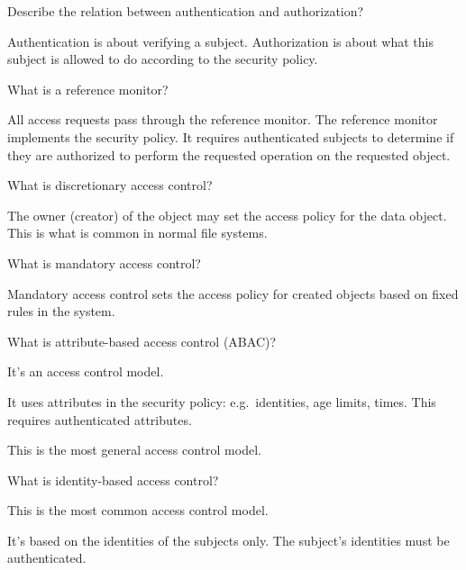 \question[3]
Describe the relation between authentication and authorization?

\begin{solution}
  Authentication is about verifying a subject.
  Authorization is about what this subject is allowed to do according to the 
  security policy.
\end{solution}


\question[3]
What is a reference monitor?

\begin{solution}
  All access requests pass through the reference monitor.
  The reference monitor implements the security policy.
  It requires authenticated subjects to determine if they are authorized to 
  perform the requested operation on the requested object.
\end{solution}


\question[2]
What is discretionary access control?

\begin{solution}
  The owner (creator) of the object may set the access policy for the data 
  object.
  This is what is common in normal file systems.
\end{solution}


\question[2]
What is mandatory access control?

\begin{solution}
  Mandatory access control sets the access policy for created objects based on 
  fixed rules in the system.
\end{solution}


\question[3]
What is attribute-based access control (ABAC)?

\begin{solution}
  It's an access control model.

  It uses attributes in the security policy: e.g.\ identities, age limits, 
  times.
  This requires authenticated attributes.

  This is the most general access control model.
\end{solution}


\question[2]
What is identity-based access control?

\begin{solution}
  This is the most common access control model.

  It's based on the identities of the subjects only.
  The subject's identities must be authenticated.
\end{solution}
